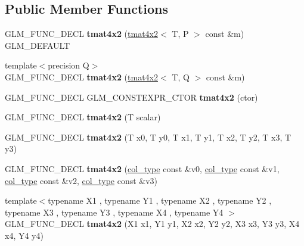 \subsection*{Public Member Functions}
\begin{DoxyCompactItemize}
\item 
\mbox{\label{structglm_1_1tmat4x2_a8573e7d7acf01aa378eee49f7e9c580a}} 
G\+L\+M\+\_\+\+F\+U\+N\+C\+\_\+\+D\+E\+CL {\bfseries tmat4x2} (\hyperlink{structglm_1_1tmat4x2}{tmat4x2}$<$ T, P $>$ const \&m) G\+L\+M\+\_\+\+D\+E\+F\+A\+U\+LT
\item 
\mbox{\label{structglm_1_1tmat4x2_a9f5f9c3246c12a56efb4a81ccb83b844}} 
{\footnotesize template$<$precision Q$>$ }\\G\+L\+M\+\_\+\+F\+U\+N\+C\+\_\+\+D\+E\+CL {\bfseries tmat4x2} (\hyperlink{structglm_1_1tmat4x2}{tmat4x2}$<$ T, Q $>$ const \&m)
\item 
\mbox{\label{structglm_1_1tmat4x2_a167d8a564385d1fa509b3149f674769a}} 
G\+L\+M\+\_\+\+F\+U\+N\+C\+\_\+\+D\+E\+CL G\+L\+M\+\_\+\+C\+O\+N\+S\+T\+E\+X\+P\+R\+\_\+\+C\+T\+OR {\bfseries tmat4x2} (ctor)
\item 
\mbox{\label{structglm_1_1tmat4x2_a1dceed004da8ca2a8badf694c6f61ced}} 
G\+L\+M\+\_\+\+F\+U\+N\+C\+\_\+\+D\+E\+CL {\bfseries tmat4x2} (T scalar)
\item 
\mbox{\label{structglm_1_1tmat4x2_a90b004f79bac6c199310a204ff4b88f0}} 
G\+L\+M\+\_\+\+F\+U\+N\+C\+\_\+\+D\+E\+CL {\bfseries tmat4x2} (T x0, T y0, T x1, T y1, T x2, T y2, T x3, T y3)
\item 
\mbox{\label{structglm_1_1tmat4x2_aa89564f4323d095565f9072ef4b01c75}} 
G\+L\+M\+\_\+\+F\+U\+N\+C\+\_\+\+D\+E\+CL {\bfseries tmat4x2} (\hyperlink{structglm_1_1tvec2}{col\+\_\+type} const \&v0, \hyperlink{structglm_1_1tvec2}{col\+\_\+type} const \&v1, \hyperlink{structglm_1_1tvec2}{col\+\_\+type} const \&v2, \hyperlink{structglm_1_1tvec2}{col\+\_\+type} const \&v3)
\item 
\mbox{\label{structglm_1_1tmat4x2_a1f10ec226d91b1b7d78aaf5c6c10b34b}} 
{\footnotesize template$<$typename X1 , typename Y1 , typename X2 , typename Y2 , typename X3 , typename Y3 , typename X4 , typename Y4 $>$ }\\G\+L\+M\+\_\+\+F\+U\+N\+C\+\_\+\+D\+E\+CL {\bfseries tmat4x2} (X1 x1, Y1 y1, X2 x2, Y2 y2, X3 x3, Y3 y3, X4 x4, Y4 y4)

\end{DoxyCompactItemize}
